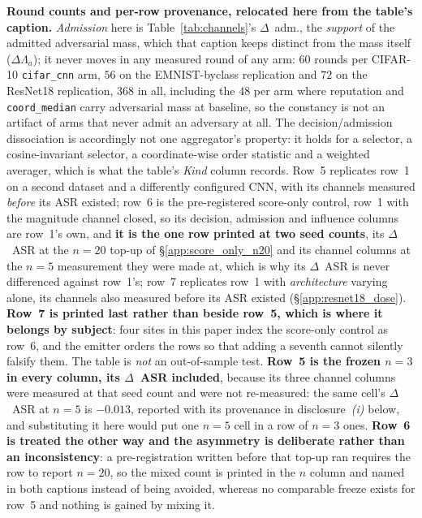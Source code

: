 \documentclass{article}
\begin{document}
\textbf{Round counts and per-row provenance, relocated here from the table's caption.} \emph{Admission} here is Table~\ref{tab:channels}'s $\Delta$~adm., the \emph{support} of the admitted adversarial mass, which that caption keeps distinct from the mass itself ($\Delta\Lambda_a$); it never moves in any measured round of any arm: $60$ rounds per CIFAR-10 \texttt{cifar\_cnn} arm, $56$ on the EMNIST-byclass replication and $72$ on the ResNet18 replication, $368$ in all, including the $48$ per arm where reputation and \texttt{coord\_median} carry adversarial mass at baseline, so the constancy is not an artifact of arms that never admit an adversary at all. The decision/admission dissociation is accordingly not one aggregator's property: it holds for a selector, a cosine-invariant selector, a coordinate-wise order statistic and a weighted averager, which is what the table's \emph{Kind} column records. Row~5 replicates row~1 on a second dataset and a differently configured CNN, with its channels measured \emph{before} its ASR existed; row~6 is the pre-registered score-only control, row~1 with the magnitude channel closed, so its decision, admission and influence columns are row~1's own, and \textbf{it is the one row printed at two seed counts}, its $\Delta$~ASR at the $n{=}20$ top-up of §\ref{app:score_only_n20} and its channel columns at the $n{=}5$ measurement they were made at, which is why its $\Delta$~ASR is never differenced against row~1's; row~7 replicates row~1 with \emph{architecture} varying alone, its channels also measured before its ASR existed (§\ref{app:resnet18_dose}). \textbf{Row~7 is printed last rather than beside row~5, which is where it belongs by subject}: four sites in this paper index the score-only control as row~6, and the emitter orders the rows so that adding a seventh cannot silently falsify them. The table is \emph{not} an out-of-sample test. \textbf{Row~5 is the frozen $n{=}3$ in every column, its $\Delta$~ASR included}, because its three channel columns were measured at that seed count and were not re-measured: the same cell's $\Delta$~ASR at $n{=}5$ is $-0.013$, reported with its provenance in disclosure~\emph{(i)} below, and substituting it here would put one $n{=}5$ cell in a row of $n{=}3$ ones. \textbf{Row~6 is treated the other way and the asymmetry is deliberate rather than an inconsistency}: a pre-registration written before that top-up ran requires the row to report $n{=}20$, so the mixed count is printed in the $n$ column and named in both captions instead of being avoided, whereas no comparable freeze exists for row~5 and nothing is gained by mixing it.
\end{document}
